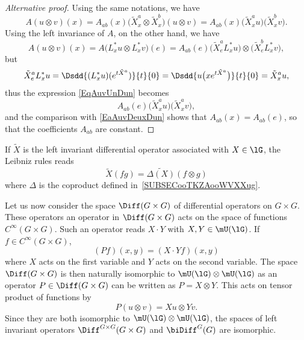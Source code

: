 \begin{proof}[Alternative proof]
	Using the same notations, we have
	\begin{equation}		\label{EaAuvDeuxDun}
		A(u\otimes v)(x)=A_{ab}(x)\big( \tilde X^a_x\otimes\tilde X^b_x \big)(u\otimes v)=A_{ab}(x)\big( \tilde X^a_xu \big)\big( \tilde X^b_xv \big).
	\end{equation}
	Using the left invariance of $A$, on the other hand, we have
	\begin{equation}		\label{EqAuvUnDun}
		A(u\otimes v)(x)=A\big( L^*_xu\otimes L^*_xv \big)(e)=A_{ab}(e)\big( \tilde X^a_eL^*_xu \big)\otimes\big( \tilde X^b_eL^*_xv \big),
	\end{equation}
	but
	\begin{equation}
		\tilde X^a_eL^*_xu=\Dsdd{ (L^*_xu)( e^{t\tilde X^a}) }{t}{0}=\Dsdd{ u\big( x e^{t\tilde X^a} \big) }{t}{0}=\tilde X^a_xu,
	\end{equation}
	thus the expression \eqref{EqAuvUnDun} becomes
	\begin{equation}
		A_{ab}(e)\big( \tilde X^a_xu \big)\big( \tilde X^a_xv \big),
	\end{equation}
	and the comparison with \eqref{EaAuvDeuxDun} shows that $A_{ab}(x)=A_{ab}(e)$, so that the coefficients $A_{ab}$ are constant.
\end{proof}

\begin{remark}  \label{REMooGIFYooTphiex}
	If $\tilde X$ is the left invariant differential operator associated with $X\in\lG$, the Leibniz rules reads
	\begin{equation}		\label{EqXfgDeltaUnif}
		\tilde X(fg)=\widetilde{\Delta(X)}(f\otimes g)
	\end{equation}
	where \( \Delta\) is the coproduct defined in~\ref{SUBSECooTKZAooWVXXug}.
\end{remark}

Let us now consider the space $\Diff(G\times G)$ of differential operators on $G\times G$. These operators an operator in $\Diff(G\times G)$ acts on the space of functions $ C^{\infty}(G\times G)$. Such an operator reads $X\cdot Y$ with $X,Y\in\mU(\lG)$. If $f\in C^{\infty}(G\times G)$,
\begin{equation}
	(Pf)(x,y)=(X\cdot Y f)(x,y)
\end{equation}
where $X$ acts on the first variable and $Y$ acts on the second variable. The space $\Diff(G\times G)$ is then naturally isomorphic to $\mU(\lG)\otimes \mU(\lG)$ as an operator $P\in\Diff(G\times G)$ can be written as $P=X\otimes Y$. This acts on tensor product of functions by
\begin{equation}
	P(u\otimes v)=Xu\otimes Yv.
\end{equation}
Since they are both isomorphic to $\mU(\lG)\otimes\mU(\lG)$, the spaces of left invariant operators $\Diff^{G\times G}(G\times G)$ and $\biDiff^G(G)$ are isomorphic.

